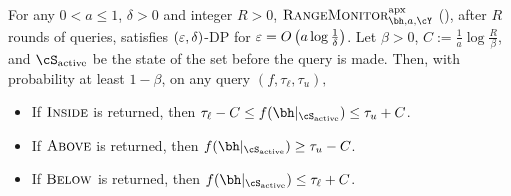 \begin{proposition}\label{prop:oim-approx-dp} 
For any $0< a\leq 1$, $\delta>0$ and integer $R > 0$, $\OutsideIntervalMonitor^{\mathrm{apx}}_{\bh, a, \cY}$ (), after $R$ rounds of queries, satisfies $(\varepsilon, \delta)$-DP for $\varepsilon = O\left(a \log \frac{1}{\delta}\right)$.  Let $\beta > 0$, $C := \frac1a \log \frac{R}{\beta}$, and $\Sactive$ be the state of the set before the query is made.  Then, with probability at least $1-\beta$, on any query $(f, \tau_\ell, \tau_u),$
\begin{itemize}[topsep=3pt,itemsep=-3pt]
    \item If $\textsc{Inside}$ is returned, then $\tau_\ell - C \le f(\bh|_{\cS_{\acti}}) \le \tau_u + C$.
    \item If $\textsc{Above}$ is returned, then $f(\bh|_{\cS_{\acti}}) \ge \tau_u - C$.
    \item If $\textsc{Below}$ is returned, then $f(\bh|_{\cS_{\acti}}) \le \tau_\ell + C$.
\end{itemize}
\end{proposition}
